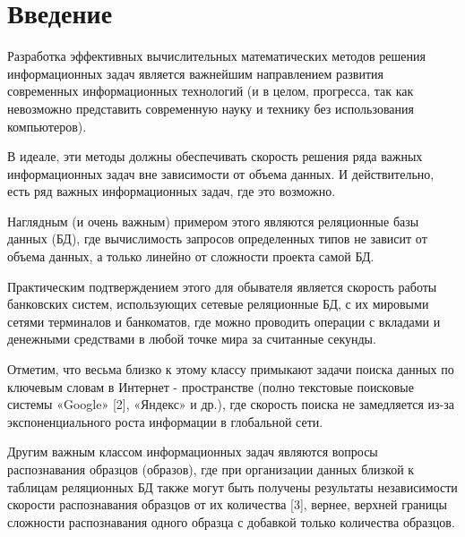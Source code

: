 \chapter*{Введение}							%
%


Разработка эффективных вычислительных математических методов решения информационных задач является важнейшим направлением развития современных информационных технологий (и в целом, прогресса, так как невозможно представить современную науку и технику  без использования компьютеров). 

В идеале, эти методы должны обеспечивать скорость решения ряда важных информационных задач вне зависимости от объема данных. И действительно, есть ряд важных  информационных задач, где это возможно. 

Наглядным (и очень важным) примером  этого являются реляционные базы данных (БД), где вычислимость запросов определенных типов не зависит от объема данных, а только линейно от сложности проекта самой БД.

Практическим подтверждением этого для обывателя является скорость работы банковских систем, использующих сетевые реляционные БД,  с их мировыми сетями терминалов и банкоматов, где можно проводить операции с вкладами и денежными средствами в любой точке мира за считанные секунды.

Отметим, что весьма близко к этому классу  примыкают задачи поиска данных по ключевым словам в Интернет - пространстве (полно текстовые поисковые системы «Google» [2], «Яндекс» и др.), где скорость поиска не замедляется из-за экспоненциального роста информации в глобальной сети.

Другим  важным классом информационных задач являются вопросы распознавания  образцов (образов), где при организации данных близкой к таблицам реляционных БД также могут быть получены результаты независимости скорости  распознавания  образцов от их количества [3], вернее, верхней границы сложности распознавания одного образца с добавкой только количества образцов. 


